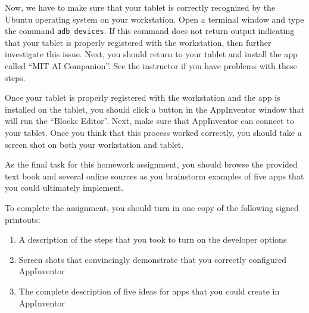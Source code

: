 Now, we have to make sure that your tablet is correctly recognized by the Ubuntu operating system on your workstation.
Open a terminal window and type the command {\tt adb devices}.  If this command does not return output indicating that
your tablet is properly registered with the workstation, then further investigate this issue.  Next, you should return
to your tablet and install the app called ``MIT AI Companion''. See the instructor if you have problems with
these steps.

Once your tablet is properly registered with the workstation and the app is installed on the tablet, you should click a
button in the AppInventor window that will run the ``Blocks Editor''.  Next, make sure that AppInventor can connect to
your tablet.  Once you think that this process worked correctly, you should take a screen shot on both your workstation
and tablet.


As the final task for this
homework assignment, you should browse the provided text book and several online sources as you brainstorm examples of
five apps that you could ultimately implement.


\noindent
To complete the assignment, you should turn in one copy of the following signed printouts: 
\vspace*{-.1in}

\begin{enumerate}
	\itemsep0em
	\item A description of the steps that you took to turn on the developer options
	\item Screen shots that convincingly demonstrate that you correctly configured AppInventor
	\item The complete description of five ideas for apps that you could create in AppInventor
\end{enumerate}


